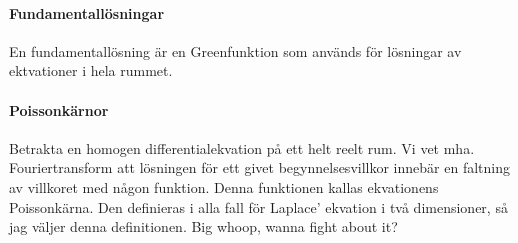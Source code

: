 \paragraph{Fundamentallösningar}
En fundamentallösning är en Greenfunktion som används för lösningar av ektvationer i hela rummet.

\paragraph{Poissonkärnor}
Betrakta en homogen differentialekvation på ett helt reelt rum. Vi vet mha. Fouriertransform att lösningen för ett givet begynnelsesvillkor innebär en faltning av villkoret med någon funktion. Denna funktionen kallas ekvationens Poissonkärna. Den definieras i alla fall för Laplace' ekvation i två dimensioner, så jag väljer denna definitionen. Big whoop, wanna fight about it?